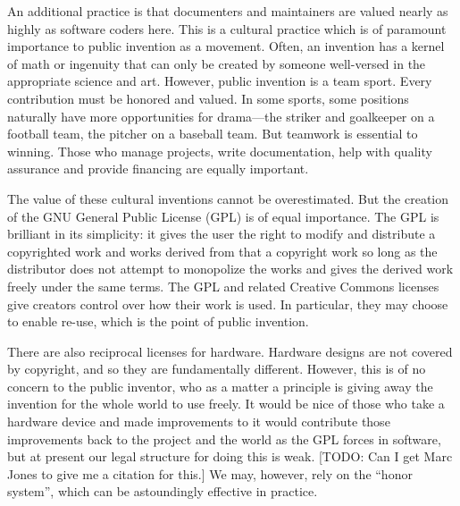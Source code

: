 \documentclass[
	fontsize=10pt, %
	twoside=false, %
	secnumdepth=1, %
]{kaobook}
\begin{document}
An additional practice is that documenters and maintainers
are valued nearly as highly as software coders here.
This is a cultural practice which is of paramount importance
to public invention as a movement.
Often, an invention has a kernel of math or ingenuity
that can only be created by someone well-versed in the
appropriate science and art.
However, public invention is a team sport.
Every contribution must be honored and valued.
In some sports, some positions naturally have more
opportunities for drama---the striker and goalkeeper on a football team,
the pitcher on a baseball team.
But teamwork is essential to winning.
Those who manage projects, write documentation,
help with quality assurance and provide financing are
equally important.

The value of these cultural inventions cannot be overestimated.
But the creation of the GNU General Public License (GPL)
is of equal importance.
The GPL is brilliant in its simplicity: it gives the
user the right to modify and distribute a copyrighted work
and works derived from that a copyright work so long as
the distributor does not attempt to monopolize the works
and gives the derived work freely under the same terms.
The GPL and related Creative Commons licenses give
creators control over how their work is used.
In particular, they may choose to enable re-use, which
is the point of public invention.

There are also reciprocal licenses for hardware.
Hardware designs are not covered by copyright, and
so they are fundamentally different.
However, this is of no concern to the public inventor,
who as a matter a principle is giving away the invention
for the whole world to use freely.
It would be nice of those who take a hardware device and made
improvements to it would contribute those improvements
back to the project and the world as the GPL forces
in software, but at present our legal structure for
doing this is weak. [TODO: Can I get Marc Jones to give me a citation for this.]
We may, however, rely on the ``honor system'', which
can be astoundingly effective in practice.
\end{document}
